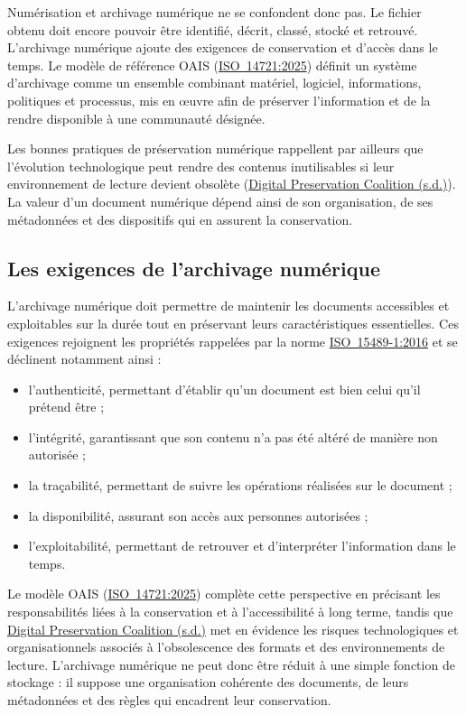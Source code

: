 \documentclass[12pt,a4paper]{report}
\newcommand{\citer}[2]{\hyperref[ref:#1]{#2}}
\begin{document}
Numérisation et archivage numérique ne se confondent donc pas. Le fichier obtenu doit encore pouvoir être identifié, décrit, classé, stocké et retrouvé. L'archivage numérique ajoute des exigences de conservation et d'accès dans le temps. Le modèle de référence OAIS (\citer{iso14721}{\mbox{ISO 14721:2025}}) définit un système d'archivage comme un ensemble combinant matériel, logiciel, informations, politiques et processus, mis en œuvre afin de préserver l'information et de la rendre disponible à une communauté désignée.

Les bonnes pratiques de préservation numérique rappellent par ailleurs que l'évolution technologique peut rendre des contenus inutilisables si leur environnement de lecture devient obsolète (\citer{dpc}{Digital Preservation Coalition (s.d.)}). La valeur d'un document numérique dépend ainsi de son organisation, de ses métadonnées et des dispositifs qui en assurent la conservation.

\subsection{Les exigences de l'archivage numérique}
L'archivage numérique doit permettre de maintenir les documents accessibles et exploitables sur la durée tout en préservant leurs caractéristiques essentielles. Ces exigences rejoignent les propriétés rappelées par la norme \citer{iso15489}{\mbox{ISO 15489-1:2016}} et se déclinent notamment ainsi :
\begin{itemize}
  \item l'authenticité, permettant d'établir qu'un document est bien celui qu'il prétend être ;
  \item l'intégrité, garantissant que son contenu n'a pas été altéré de manière non autorisée ;
  \item la traçabilité, permettant de suivre les opérations réalisées sur le document ;
  \item la disponibilité, assurant son accès aux personnes autorisées ;
  \item l'exploitabilité, permettant de retrouver et d'interpréter l'information dans le temps.
\end{itemize}

Le modèle OAIS (\citer{iso14721}{\mbox{ISO 14721:2025}}) complète cette perspective en précisant les responsabilités liées à la conservation et à l'accessibilité à long terme, tandis que \citer{dpc}{Digital Preservation Coalition (s.d.)} met en évidence les risques technologiques et organisationnels associés à l'obsolescence des formats et des environnements de lecture. L'archivage numérique ne peut donc être réduit à une simple fonction de stockage : il suppose une organisation cohérente des documents, de leurs métadonnées et des règles qui encadrent leur conservation.
\end{document}
